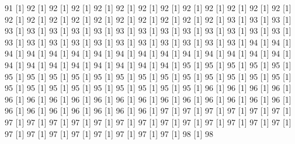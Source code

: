 \documentclass[12pt]{article}
\begin{document}
\begin{Schunk}
\begin{Soutput}
[1] 91%
[1] 92%
[1] 92%
[1] 92%
[1] 92%
[1] 92%
[1] 92%
[1] 92%
[1] 92%
[1] 92%
[1] 92%
[1] 92%
[1] 92%
[1] 92%
[1] 92%
[1] 92%
[1] 92%
[1] 92%
[1] 92%
[1] 92%
[1] 92%
[1] 92%
[1] 92%
[1] 93%
[1] 93%
[1] 93%
[1] 93%
[1] 93%
[1] 93%
[1] 93%
[1] 93%
[1] 93%
[1] 93%
[1] 93%
[1] 93%
[1] 93%
[1] 93%
[1] 93%
[1] 93%
[1] 93%
[1] 93%
[1] 93%
[1] 93%
[1] 93%
[1] 93%
[1] 93%
[1] 93%
[1] 93%
[1] 93%
[1] 93%
[1] 94%
[1] 94%
[1] 94%
[1] 94%
[1] 94%
[1] 94%
[1] 94%
[1] 94%
[1] 94%
[1] 94%
[1] 94%
[1] 94%
[1] 94%
[1] 94%
[1] 94%
[1] 94%
[1] 94%
[1] 94%
[1] 94%
[1] 94%
[1] 94%
[1] 94%
[1] 94%
[1] 95%
[1] 95%
[1] 95%
[1] 95%
[1] 95%
[1] 95%
[1] 95%
[1] 95%
[1] 95%
[1] 95%
[1] 95%
[1] 95%
[1] 95%
[1] 95%
[1] 95%
[1] 95%
[1] 95%
[1] 95%
[1] 95%
[1] 95%
[1] 95%
[1] 95%
[1] 95%
[1] 95%
[1] 95%
[1] 95%
[1] 95%
[1] 96%
[1] 96%
[1] 96%
[1] 96%
[1] 96%
[1] 96%
[1] 96%
[1] 96%
[1] 96%
[1] 96%
[1] 96%
[1] 96%
[1] 96%
[1] 96%
[1] 96%
[1] 96%
[1] 96%
[1] 96%
[1] 96%
[1] 96%
[1] 96%
[1] 96%
[1] 96%
[1] 96%
[1] 97%
[1] 97%
[1] 97%
[1] 97%
[1] 97%
[1] 97%
[1] 97%
[1] 97%
[1] 97%
[1] 97%
[1] 97%
[1] 97%
[1] 97%
[1] 97%
[1] 97%
[1] 97%
[1] 97%
[1] 97%
[1] 97%
[1] 97%
[1] 97%
[1] 97%
[1] 97%
[1] 97%
[1] 97%
[1] 97%
[1] 97%
[1] 98%
[1] 98%

\end{Soutput}
\end{Schunk}
\end{document}
